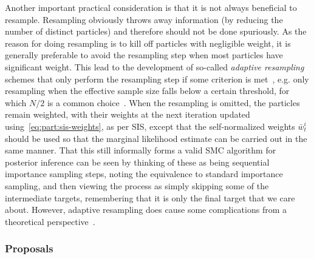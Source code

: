 Another important practical consideration is that it is not always beneficial to resample.  Resampling
obviously throws away information (by reducing the number of distinct particles)
and therefore should not be done spuriously.  As the reason for doing
resampling is to kill off particles with negligible weight, it is generally preferable to avoid the resampling step
when most particles have significant weight.  This lead to the development of so-called \emph{adaptive resampling}
schemes that only perform the resampling step if some criterion is met~\citep{liu1995blind,del2012adaptive}, e.g. 
only resampling when the effective sample size falls below a certain threshold,
for which $N/2$ is a common choice~\citep{doucet2009tutorial}.
When the resampling is omitted, the particles remain weighted, with their weights at the next iteration updated
using~\eqref{eq:part:sis-weights}, as per SIS, except that the self-normalized weights $\bar{w}_t^i$ should be used so that the
marginal likelihood estimate can be carried out in the same manner.
That this still informally forms a valid SMC algorithm for posterior inference can be seen by thinking of these as being sequential importance
sampling steps, noting the equivalence to standard importance sampling, and then viewing the process as simply
skipping some of the intermediate targets, remembering that it is only the final target that we care about.
However, adaptive resampling does cause some complications from a theoretical perspective~\citep{del2012adaptive}.

\subsubsection{Proposals}
\label{sec:part:smc:prat:opt}

